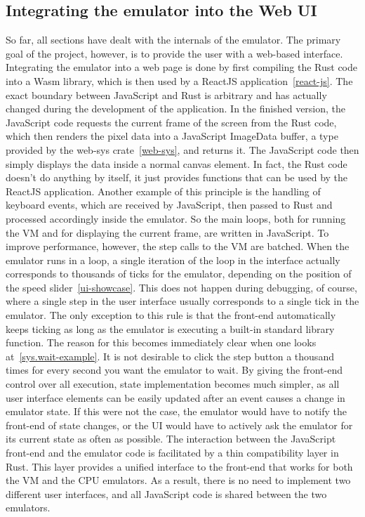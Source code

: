 \subsection{Integrating the emulator into the Web UI}
So far, all sections have dealt with the internals of the emulator.
The primary goal of the project, however, is to provide the user with a web-based interface.
Integrating the emulator into a web page is done by first compiling the Rust code into a Wasm library, which is then used by a ReactJS application~\ref{react-js}.
The exact boundary between JavaScript and Rust is arbitrary and has actually changed during the development of the application.
In the finished version, the JavaScript code requests the current frame of the screen from the Rust code, which then renders the pixel data into a JavaScript ImageData buffer, a type provided by the web-sys crate~\ref{web-sys}, and returns it.
The JavaScript code then simply displays the data inside a normal canvas element.
In fact, the Rust code doesn't do anything by itself, it just provides functions that can be used by the ReactJS application.
Another example of this principle is the handling of keyboard events, which are received by JavaScript, then passed to Rust and processed accordingly inside the emulator.
So the main loops, both for running the VM and for displaying the current frame, are written in JavaScript.
To improve performance, however, the step calls to the VM are batched.
When the emulator runs in a loop, a single iteration of the loop in the interface actually corresponds to thousands of ticks for the emulator, depending on the position of the speed slider~\ref{ui-showcase}.
This does not happen during debugging, of course, where a single step in the user interface usually corresponds to a single tick in the emulator.
The only exception to this rule is that the front-end automatically keeps ticking as long as the emulator is executing a built-in standard library function.
The reason for this becomes immediately clear when one looks at~\cref{sys.wait-example}.
It is not desirable to click the step button a thousand times for every second you want the emulator to wait.
By giving the front-end control over all execution, state implementation becomes much simpler, as all user interface elements can be easily updated after an event causes a change in emulator state.
If this were not the case, the emulator would have to notify the front-end of state changes, or the UI would have to actively ask the emulator for its current state as often as possible.
The interaction between the JavaScript front-end and the emulator code is facilitated by a thin compatibility layer in Rust.
This layer provides a unified interface to the front-end that works for both the VM and the CPU emulators.
As a result, there is no need to implement two different user interfaces, and all JavaScript code is shared between the two emulators.

